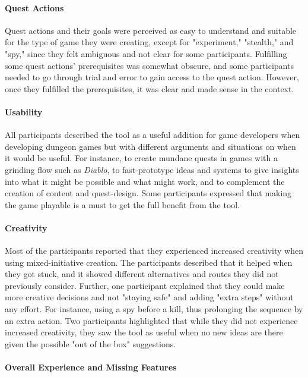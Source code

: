 \paragraph{Quest Actions}

Quest actions and their goals were perceived as easy to understand and suitable for the type of game they were creating, except for "experiment," "stealth," and "spy," since they felt ambiguous and not clear for some participants. Fulfilling some quest actions' prerequisites was somewhat obscure, and some participants needed to go through trial and error to gain access to the quest action. However, once they fulfilled the prerequisites, it was clear and made sense in the context.

\paragraph{Usability}

All participants described the tool as a useful addition for game developers when developing dungeon games but with different arguments and situations on when it would be useful. For instance, to create mundane quests in games with a grinding flow such as \emph{Diablo}, to fast-prototype ideas and systems to give insights into what it might be possible and what might work, and to complement the creation of content and quest-design. Some participants expressed that making the game playable is a must to get the full benefit from the tool.

\paragraph{Creativity}

Most of the participants reported that they experienced increased creativity when using mixed-initiative creation. The participants described that it helped when they got stuck, and it showed different alternatives and routes they did not previously consider. Further, one participant explained that they could make more creative decisions and not "staying safe" and adding "extra steps" without any effort. For instance, using a spy before a kill, thus prolonging the sequence by an extra action. Two participants highlighted that while they did not experience increased creativity, they saw the tool as useful when no new ideas are there given the possible "out of the box" suggestions.

\paragraph{Overall Experience and Missing Features}

